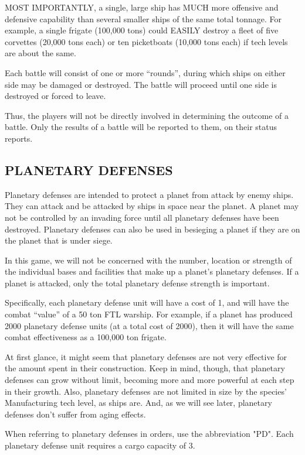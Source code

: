 \documentclass[10pt,titlepage]{article}
\begin{document}
MOST IMPORTANTLY, a single, large ship has MUCH more offensive and defensive
capability than several smaller ships of the same total tonnage.  For example,
a single frigate (100,000 tons) could EASILY destroy a fleet of five corvettes
(20,000 tons each) or ten picketboats (10,000 tons each) if tech levels are
about the same.

Each battle will consist of one or more ``rounds'', during which ships on either
side may be damaged or destroyed.  The battle will proceed until one side is
destroyed or forced to leave.

Thus, the players will not be directly involved in determining the outcome
of a battle.  Only the results of a battle will be reported to them, on their
status reports.


\subsection{PLANETARY DEFENSES}
\label{sec:planetarydefenses}


Planetary defenses are intended to protect a planet from attack by enemy ships.
They can attack and be attacked by ships in space near the planet.  A planet
may not be controlled by an invading force until all planetary defenses have
been destroyed.  Planetary defenses can also be used in besieging a planet if
they are on the planet that is under siege.

In this game, we will not be concerned with the number, location or strength of
the individual bases and facilities that make up a planet's planetary defenses.
If a planet is attacked, only the total planetary defense strength is
important.

Specifically, each planetary defense unit will have a cost of 1, and will have
the combat ``value'' of a 50 ton FTL warship.  For example, if a planet has
produced 2000 planetary defense units (at a total cost of 2000), then it will
have the same combat effectiveness as a 100,000 ton frigate.

At first glance, it might seem that planetary defenses are not very effective
for the amount spent in their construction.  Keep in mind, though, that
planetary defenses can grow without limit, becoming more and more powerful at
each step in their growth.  Also, planetary defenses are not limited in size
by the species' Manufacturing tech level, as ships are.  And, as we will see
later, planetary defenses don't suffer from aging effects.

When referring to planetary defenses in orders, use the abbreviation "PD".
Each planetary defense unit requires a cargo capacity of 3.
\end{document}
